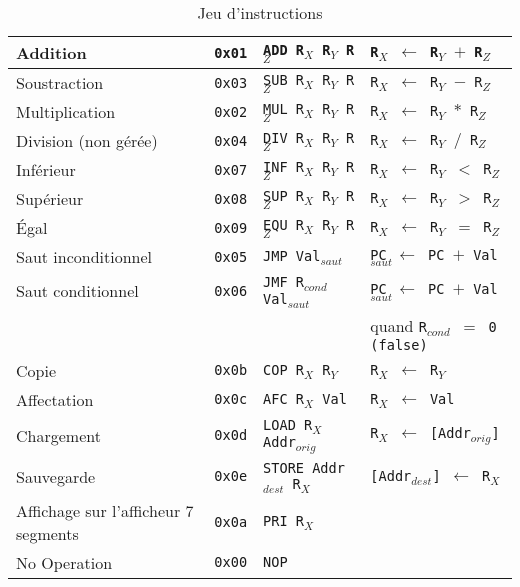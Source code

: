 \begin{table}[h!]
  \centering
  \begin{tabular}{| l | l | l | l |}
    \hline
    Addition & \texttt{0x01} & \texttt{ADD  R$_{X}$  R$_{Y}$  R$_{Z}$} & \texttt{R$_{X}$ $\leftarrow$ R$_{Y}$ $+$ R$_{Z}$} \\ \hline
    Soustraction & \texttt{0x03} & \texttt{SUB  R$_{X}$  R$_{Y}$  R$_{Z}$} & \texttt{R$_{X}$ $\leftarrow$ R$_{Y}$ $-$ R$_{Z}$} \\ \hline
    Multiplication & \texttt{0x02} & \texttt{MUL  R$_{X}$  R$_{Y}$  R$_{Z}$} & \texttt{R$_{X}$ $\leftarrow$ R$_{Y}$ $*$ R$_{Z}$} \\ \hline
    Division (non gérée) & \texttt{0x04} & \texttt{DIV  R$_{X}$  R$_{Y}$  R$_{Z}$} & \texttt{R$_{X}$ $\leftarrow$ R$_{Y}$ $/$ R$_{Z}$} \\ \hline \hline
    Inférieur & \texttt{0x07} & \texttt{INF R$_{X}$  R$_{Y}$  R$_{Z}$} & \texttt{R$_{X}$ $\leftarrow$ R$_{Y}$ $<$ R$_{Z}$} \\ \hline
    Supérieur & \texttt{0x08} & \texttt{SUP R$_{X}$  R$_{Y}$  R$_{Z}$} & \texttt{R$_{X}$ $\leftarrow$ R$_{Y}$ $>$ R$_{Z}$} \\ \hline
    Égal & \texttt{0x09} & \texttt{EQU R$_{X}$  R$_{Y}$  R$_{Z}$} & \texttt{R$_{X}$ $\leftarrow$ R$_{Y}$ $=$ R$_{Z}$} \\ \hline
    Saut inconditionnel & \texttt{0x05} & \texttt{JMP Val$_{saut}$} & \texttt{PC $\leftarrow$ PC $+$ Val$_{saut}$} \\ \hline
    Saut conditionnel & \texttt{0x06} & \texttt{JMF R$_{cond}$  Val$_{saut}$} & \texttt{PC $\leftarrow$ PC $+$ Val$_{saut}$}\\
     & & & quand \texttt{R$_{cond}$ $=$ 0 (false)} \\ \hline \hline
    Copie & \texttt{0x0b} & \texttt{COP  R$_{X}$  R$_{Y}$} & \texttt{R$_{X}$ $\leftarrow$ R$_{Y}$} \\ \hline
    Affectation & \texttt{0x0c} & \texttt{AFC  R$_{X}$  Val} & \texttt{R$_{X}$ $\leftarrow$ Val} \\ \hline
    Chargement & \texttt{0x0d} & \texttt{LOAD  R$_{X}$  Addr$_{orig}$} & \texttt{R$_{X}$ $\leftarrow$ [Addr$_{orig}$]} \\ \hline 
    Sauvegarde & \texttt{0x0e} & \texttt{STORE  Addr$_{dest}$  R$_{X}$} & \texttt{[Addr$_{dest}$] $\leftarrow$ R$_{X}$ }\\ \hline \hline
    Affichage sur l'afficheur 7 segments & \texttt{0x0a} & \texttt{PRI  R$_{X}$} &  \\ \hline \hline
    No Operation & \texttt{0x00} & \texttt{NOP} & \\
    \hline
  \end{tabular}

  

  \caption{Jeu d'instructions}
  \label{tab:instructions-proc}
\end{table}


